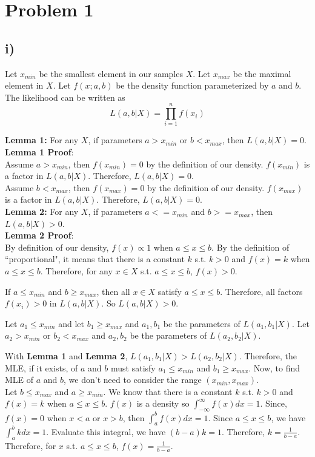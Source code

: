 \documentclass[twoside,11pt]{homework}
\date{\today} %
\begin{document}
\maketitle

\section*{Problem 1}
\subsection*{i)}
Let $x_{min}$ be the smallest element in our samples $X$. Let $x_{max}$ be the maximal element in $X$. 
Let $f(x;a,b)$ be the density function parameterized by $a$ and $b$.
The likelihood can be written as
\begin{equation}
    L(a,b|X) = \prod_{i=1}^n f(x_i)
\end{equation}

\noindent \textbf{Lemma 1:} For any $X$, if parameters $a > x_{min}$ or $b < x_{max}$, then $L(a,b|X)=0$. \\
\textbf{Lemma 1 Proof}: \\
Assume $a > x_{min}$, then $f(x_{min}) = 0$ by the definition of our density. $f(x_{min})$ is a factor in $L(a,b|X)$. Therefore, $L(a,b|X) = 0$. \\
Assume $b < x_{max}$, then $f(x_{max}) = 0$ by the definition of our density. $f(x_{max})$ is a factor in $L(a,b|X)$. Therefore, $L(a,b|X) = 0$. \\

\noindent \textbf{Lemma 2:} For any $X$, if parameters $a <= x_{min}$ and $b >= x_{max}$, then $L(a,b|X) > 0$. \\
\textbf{Lemma 2 Proof}: \\
By definition of our density, $f(x) \propto 1$ when $a \leq x \leq b$. By the definition of ``proportional", it means that there is a constant $k$ s.t. $k>0$ and $f(x) = k$ when $a \leq x \leq b$. 
Therefore, for any $x \in X$ s.t. $a \leq x \leq b$, $f(x) > 0 $. 

If $a \leq x_{min}$ and $b \geq x_{max}$, then all $x \in X$ satisfy $a \leq x \leq b$. Therefore, all factors $f(x_i)>0$ in $L(a,b|X)$. So $L(a,b|X)>0$. 

Let $a_1 \leq x_{min}$ and let $b_1 \geq x_{max}$ and $a_1, b_1$ be the parameters of $L(a_1, b_1|X)$. Let $a_2 > x_{min}$ or $b_2 < x_{max}$ and $a_2, b_2$ be the parameters of $L(a_2, b_2|X)$. 


With \textbf{Lemma 1} and \textbf{Lemma 2}, $L(a_1, b_1|X) > L(a_2, b_2|X)$. Therefore, the MLE, if it exists, of $a$ and $b$ must satisfy $a_1 \leq x_{min}$ and $b_1 \geq x_{max}$. Now, to find MLE of $a$ and $b$, we don't need to consider the range $(x_{min}, x_{max})$.
\\
\noindent Let $b \leq x_{max}$ and $a \geq  x_{min}$. We know that there is a constant $k$ s.t. $k>0$ and $f(x) = k$ when $a \leq x \leq b$. $f(x)$ is a density so $\int_{-\infty}^{\infty}f(x)dx = 1$. Since, $f(x) = 0$ when $ x < a$ or $x > b$, then $\int_{a}^{b}f(x)dx = 1$. Since $a \leq x \leq b$, we have $\int_{a}^{b}kdx = 1$. Evaluate this integral, we have $(b-a)k = 1$. Therefore, $k = \frac{1}{b-a}$. Therefore, for $x$ s.t. $a \leq x \leq b$, $f(x) = \frac{1}{b-a}$. 
\end{document}

